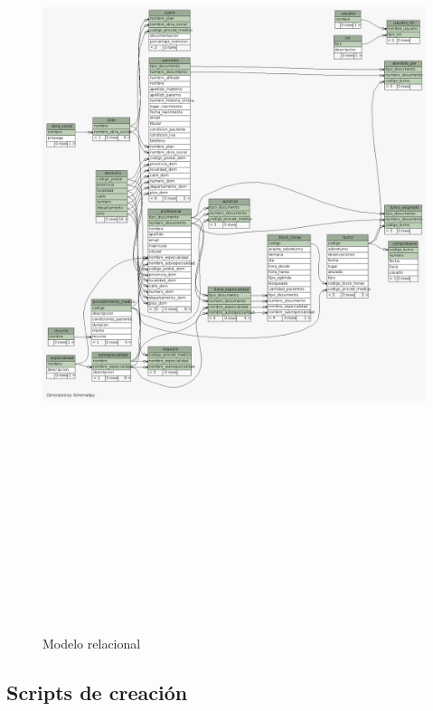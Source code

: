 \documentclass[a4paper,11pt]{article}
\begin{document}
\begin{figure}[h!t]
  \centering
  \includegraphics[width=15cm,height=25cm,angle=0]{build/images/relacional.png}
  \caption{Modelo relacional}
  \label{fig:relacional}
\end{figure}

\FloatBarrier

\subsection{\textbf{Scripts de creación}}
\end{document}
